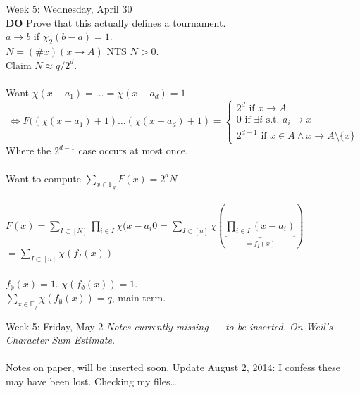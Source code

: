 \documentclass[12pt]{article}
\theoremstyle{remark}
\newcommand{\F}{\mathbb{F}}
\newcommand{\st}{\text{ s.t. }}
\newcommand{\IF}{\text{ if }}
\begin{document}
\begin{section}{Week 5: Wednesday, April 30}
\\\textbf{DO} Prove that this actually defines a tournament.
\\$a \to b$ if $\chi_2(b-a) =1$.
\\$N = (\# x)(x \to A)$ NTS $N>0$.
\\Claim $N \approx q/2^d$.
\\\\
Want $\chi(x-a_1) = \ldots = \chi(x-a_d) = 1$.
$$\Leftrightarrow F((\chi(x-a_1)+1) \ldots (\chi(x-a_d)+1) =
\begin{cases}
2^d \IF x \to A\\
0 \IF \exists i \st a_i \to x
\\
2^{d-1} \IF x \in A \land x\to A\setminus \{x\}
\end{cases}
$$
Where the $2^{d-1}$ case occurs at most once.
\\\\
Want to compute $\sum_{x \in \F_q} F(x) = 2^d N$
\\\\
$F(x) = \sum_{I \subset [N]} \prod_{i \in I} \chi(x-a_i0 = \sum_{I \subset [n]} \chi(\underbrace{\prod_{i\in I} (x-a_i)}_{=f_I(x)})$
\\$= \sum_{I \subset [n]} \chi(f_I(x))$
\\\\
$f_\emptyset(x)=1$. $\chi(f_\emptyset(x)) = 1$.
\\$\sum_{x \in \F_q} \chi(f_\emptyset(x)) = q$, main term.
\end{section}

\newpage

\label{15}\begin{section}{Week 5: Friday, May 2}
\indent\textit{Notes currently missing --- to be inserted. On Weil's Character Sum Estimate.}\\\\
Notes on paper, will be inserted soon. Update August 2, 2014: I confess these may have been lost. Checking my files\ldots
\end{section}
\end{document}
